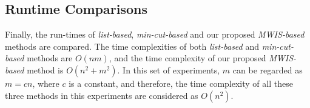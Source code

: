 \documentclass[10pt,journal]{IEEEtran}
\begin{document}








\subsection{Runtime Comparisons}


Finally, the run-times of \textit{list-based}, \textit{min-cut-based} and our proposed \textit{MWIS-based} methods are compared. The time complexities of both \textit{list-based} and \textit{min-cut-based} methods are $O(nm)$, and the time complexity of our proposed \textit{MWIS-based} method is $O(n^2+m^2)$. In this set of experiments, $m$ can be regarded as $m=cn$, where $c$ is a constant, and therefore, the time complexity of all these three methods in this experiments are considered as $O(n^2)$.
\end{document}
